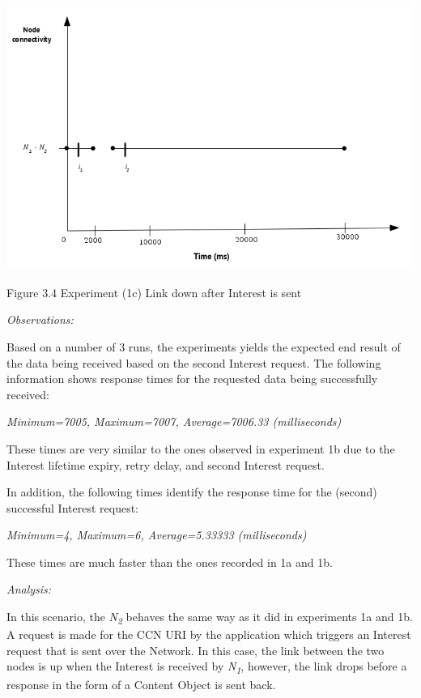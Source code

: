 \documentclass[a4paper,12pt]{report}      %
\begin{document}
\noindent\includegraphics[scale=0.55]{exp1c_timediag.jpg}\newline
\begin{center}Figure 3.4 Experiment (1c) Link down after Interest is sent\end{center}

\vspace*{1\baselineskip}\noindent\emph{Observations:}

Based on a number of 3 runs, the experiments yields the expected end result of the data being received
based on the second Interest request. The following information shows response times for the requested
data being successfully received:

\begin{center}\textsl{Minimum=7005, Maximum=7007, Average=7006.33 (milliseconds)}\end{center}

These times are very similar to the ones observed in experiment 1b due to the Interest lifetime expiry,
retry delay, and second Interest request.

In addition, the following times identify the response time for the (second) successful Interest request:

\begin{center}\textsl{Minimum=4, Maximum=6, Average=5.33333 (milliseconds)}\end{center}

These times are much faster than the ones recorded in 1a and 1b.

\vspace*{1\baselineskip}\noindent\emph{Analysis:}

In this scenario, the  \emph{N\textsubscript{2}} behaves the same way as it did in experiments 1a and 1b. A request
is made for the CCN URI by the application which triggers an Interest request that is sent over the
Network. In this case, the link between the two nodes is up when the Interest is received by  \emph{N\textsubscript{1}}, 
however, the link drops before a response in the form of a Content Object is sent back.
\end{document}
